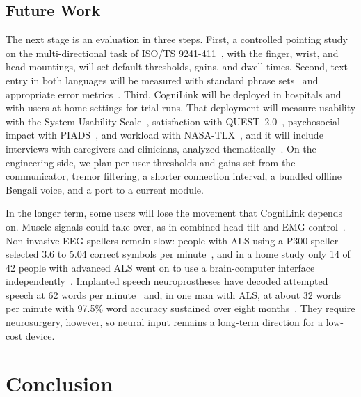 \documentclass[journal]{IEEEtran}
\begin{document}
\subsection{Future Work}
The next stage is an evaluation in three steps. First, a controlled pointing study on the multi-directional task of ISO/TS 9241-411~\cite{iso2012,douglas1999}, with the finger, wrist, and head mountings, will set default thresholds, gains, and dwell times. Second, text entry in both languages will be measured with standard phrase sets~\cite{mackenzie2003,arif2016} and appropriate error metrics~\cite{soukoreff2003,sarcar2015}. Third, CogniLink will be deployed in hospitals and with users at home settings for trial runs. That deployment will measure usability with the System Usability Scale~\cite{brooke1996}, satisfaction with QUEST~2.0~\cite{demers2002}, psychosocial impact with PIADS~\cite{day1996}, and workload with NASA-TLX~\cite{hart1988}, and it will include interviews with caregivers and clinicians, analyzed thematically~\cite{braun2006}. On the engineering side, we plan per-user thresholds and gains set from the communicator, tremor filtering, a shorter connection interval, a bundled offline Bengali voice, and a port to a current module.

In the longer term, some users will lose the movement that CogniLink depends on. Muscle signals could take over, as in combined head-tilt and EMG control~\cite{vojtech2020}. Non-invasive EEG spellers remain slow: people with ALS using a P300 speller selected 3.6 to 5.04 correct symbols per minute~\cite{guy2018}, and in a home study only 14 of 42 people with advanced ALS went on to use a brain-computer interface independently~\cite{wolpaw2018}. Implanted speech neuroprostheses have decoded attempted speech at 62 words per minute~\cite{willett2023} and, in one man with ALS, at about 32 words per minute with 97.5\% word accuracy sustained over eight months~\cite{card2024}. They require neurosurgery, however, so neural input remains a long-term direction for a low-cost device.

\section{Conclusion}
\label{sec:conclusion}
\end{document}
